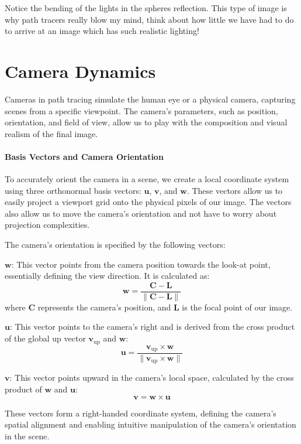 \documentclass[12pt]{article}
\begin{document}
Notice the bending of the lights in the spheres reflection. This type of image is why path tracers really blow my mind, think about how little we have had to do to arrive at an image which has such realistic lighting!
\pagebreak
\section{Camera Dynamics}
\label{sec:camera}

Cameras in path tracing simulate the human eye or a physical camera, capturing scenes from a specific viewpoint. The camera's parameters, such as position, orientation, and field of view, allow us to play with the composition and visual realism of the final image.

\paragraph{Basis Vectors and Camera Orientation}
To accurately orient the camera in a scene, we create a local coordinate system using three orthonormal basis vectors: \(\mathbf{u}\), \(\mathbf{v}\), and \(\mathbf{w}\). These vectors allow us to easily project a viewport grid onto the physical pixels of our image. The vectors also allow us to move the camera's orientation and not have to worry about projection complexities.

The camera's orientation is specified by the following vectors:

\(\mathbf{w}\): This vector points from the camera position towards the look-at point, essentially defining the view direction. It is calculated as:
\[
    \mathbf{w} = \frac{\mathbf{C} - \mathbf{L}}{\|\mathbf{C} - \mathbf{L}\|}
\]
where \(\mathbf{C}\) represents the camera's position, and \(\mathbf{L}\) is the focal point of our image.

\(\mathbf{u}\): This vector points to the camera's right and is derived from the cross product of the global up vector \(\mathbf{v}_{\text{up}}\) and \(\mathbf{w}\):
\[
    \mathbf{u} = \frac{\mathbf{v}_{\text{up}} \times \mathbf{w}}{\|\mathbf{v}_{\text{up}} \times \mathbf{w}\|}
\]

\(\mathbf{v}\): This vector points upward in the camera's local space, calculated by the cross product of \(\mathbf{w}\) and \(\mathbf{u}\):
\[
    \mathbf{v} = \mathbf{w} \times \mathbf{u}
\]

These vectors form a right-handed coordinate system, defining the camera's spatial alignment and enabling intuitive manipulation of the camera's orientation in the scene.
\end{document}
